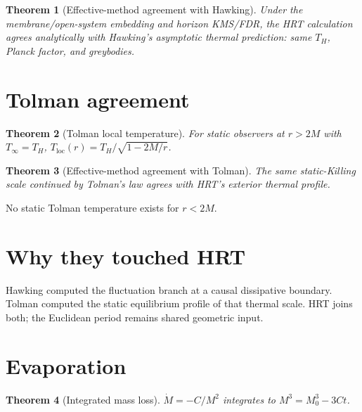 \documentclass[11pt]{article}
\newtheorem{theorem}{Theorem}[section]
\theoremstyle{definition}
\theoremstyle{remark}
\begin{document}
\begin{theorem}[Effective-method agreement with Hawking]
Under the membrane/open-system embedding and horizon KMS/FDR, the HRT calculation
agrees analytically with Hawking's asymptotic thermal prediction: same $T_H$, Planck
factor, and greybodies.
\end{theorem}

\section{Tolman agreement}
\begin{theorem}[Tolman local temperature]
For static observers at $r>2M$ with $T_\infty=T_H$,
$T_{\mathrm{loc}}(r)=T_H/\sqrt{1-2M/r}$.
\end{theorem}

\begin{theorem}[Effective-method agreement with Tolman]
The same static-Killing scale continued by Tolman's law agrees with HRT's exterior
thermal profile.
\end{theorem}

No static Tolman temperature exists for $r<2M$.

\section{Why they touched HRT}
Hawking computed the fluctuation branch at a causal dissipative boundary.
Tolman computed the static equilibrium profile of that thermal scale.
HRT joins both; the Euclidean period remains shared geometric input.

\section{Evaporation}
\begin{theorem}[Integrated mass loss]
$\dot M=-C/M^2$ integrates to $M^3=M_0^3-3Ct$.
\end{theorem}
\end{document}

